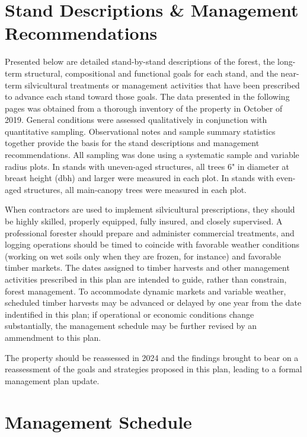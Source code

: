 \documentclass[]{tufte-handout}
\begin{document}
\section{Stand Descriptions \& Management
Recommendations}\label{stand-descriptions-management-recommendations}

Presented below are detailed stand-by-stand descriptions of the forest,
the long-term structural, compositional and functional goals for each
stand, and the near-term silvicultural treatments or management
activities that have been prescribed to advance each stand toward those
goals. The data presented in the following pages was obtained from a
thorough inventory of the property in October of 2019. General
conditions were assessed qualitatively in conjunction with quantitative
sampling. Observational notes and sample summary statistics together
provide the basis for the stand descriptions and management
recommendations. All sampling was done using a systematic sample and
variable radius plots. In stands with uneven-aged structures, all trees
6" in diameter at breast height (dbh) and larger were measured in each
plot. In stands with even-aged structures, all main-canopy trees were
measured in each plot.

When contractors are used to implement silvicultural prescriptions, they
should be highly skilled, properly equipped, fully insured, and closely
supervised. A professional forester should prepare and administer
commercial treatments, and logging operations should be timed to
coincide with favorable weather conditions (working on wet soils only
when they are frozen, for instance) and favorable timber markets. The
dates assigned to timber harvests and other management activities
prescribed in this plan are intended to guide, rather than constrain,
forest management. To accommodate dynamic markets and variable weather,
scheduled timber harvests may be advanced or delayed by one year from
the date indentified in this plan; if operational or economic conditions
change substantially, the management schedule may be further revised by
an ammendment to this plan.

The property should be reassessed in 2024 and the findings brought to
bear on a reassessment of the goals and strategies proposed in this
plan, leading to a formal management plan update.

\newpage

\section{Management Schedule}\label{management-schedule}
\end{document}
